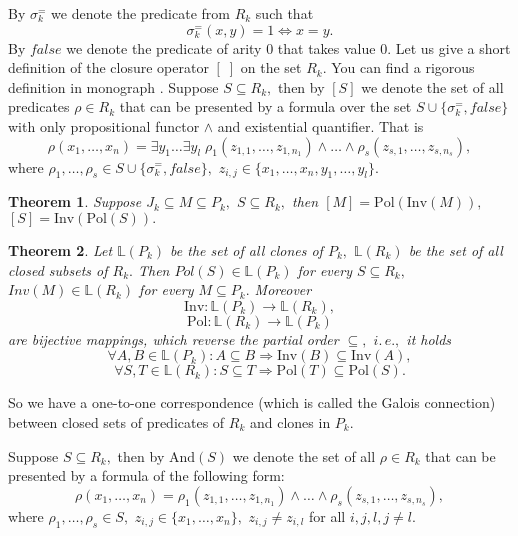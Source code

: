 \documentclass{au}
\theoremstyle{plain}
\newtheorem{theorem}{Theorem}
\theoremstyle{definition}
\theoremstyle{remark}
\numberwithin{equation}{section}
\begin{document}
By $\sigma_{k}^{=}$ we denote the predicate from $R_{k}$ such that
$$\sigma_{k}^{=}(x,y) = 1 \Longleftrightarrow x = y.$$
By $false$ we denote the predicate of arity 0 that takes value 0.
Let us give a short definition of the closure operator $[\;]$ on the set $R_{k}.$
You can find a rigorous definition in monograph \cite{lau}.
Suppose $S\subseteq R_{k},$ then by $[S]$ we denote the set of all
predicates $\rho\in R_{k}$ that can be presented by a formula over the set $S\cup \{\sigma_{k}^{=}, false\}$
with only propositional functor $\wedge$ and existential quantifier. That is
$$\rho (x_{1},\ldots,x_{n}) = \exists
y_{1}\ldots \exists y_{l} \;
\rho_{1}(z_{1,1},\ldots,z_{1,n_{1}})\wedge \ldots \wedge
\rho_{s}(z_{s,1},\ldots,z_{s,n_{s}}),$$
where $\rho_{1},\ldots,\rho_{s}\in S\cup \{\sigma_{k}^{=}, false\},$
$z_{i,j}\in \{x_{1},\ldots,x_{n},y_{1},\ldots,y_{l}\}.$

\begin{theorem}\cite{bond,lau}\label{bondar1}
Suppose $J_{k}\subseteq M\subseteq P_{k},$ $S\subseteq R_{k},$
then $[M] = {
\mathrm{Pol}
}({
\mathrm{Inv}
}(M)),$
$[S] = {
\mathrm{Inv}
}({
\mathrm{Pol}
}(S)).$

\end{theorem}

\begin{theorem}\cite{bond,lau} \label{bondar2}
Let $\mathbb L(P_{k})$ be the set of all clones of $P_{k},$
$\mathbb L(R_{k})$ be the set of all closed subsets of $R_{k}.$
Then $Pol(S)\in \mathbb L(P_{k})$ for every $S\subseteq R_{k},$
$Inv(M)\in \mathbb L(R_{k})$ for every $M\subseteq P_{k}.$
Moreover
$${
\mathrm{Inv}
}: \mathbb L(P_{k}) \longrightarrow \mathbb L(R_{k}),$$
$${
\mathrm{Pol}
}: \mathbb L(R_{k}) \longrightarrow \mathbb L(P_{k})$$
are bijective mappings, which reverse the partial order $\subseteq,$
$i.\,e.,$ it holds
$$\forall A,B\in \mathbb L(P_{k}): A\subseteq B \Rightarrow {
\mathrm{Inv}
}(B)\subseteq {
\mathrm{Inv}
}(A),$$
$$\forall S,T\in \mathbb L(R_{k}): S\subseteq T \Rightarrow {
\mathrm{Pol}
}(T)\subseteq {
\mathrm{Pol}
}(S).$$

\end{theorem}

So we have a one-to-one correspondence (which is called the Galois connection)
between closed sets of predicates of $R_{k}$ and clones in $P_{k}$.

Suppose $S\subseteq R_{k},$ then by ${
\mathrm{And}
}(S)$ we denote the set of all $\rho\in R_{k}$ that can be presented by
a formula of the following form:
$$\rho (x_{1},\ldots,x_{n}) = \rho_{1}(z_{1,1},\ldots,z_{1,n_{1}})\wedge \ldots \wedge
\rho_{s}(z_{s,1},\ldots,z_{s,n_{s}}),$$
where $\rho_{1},\ldots,\rho_{s}\in S,$
$z_{i,j}\in \{x_{1},\ldots,x_{n}\},$ $z_{i,j}\neq z_{i,l}$ for all $i,j,l,j\neq l.$
\end{document}
